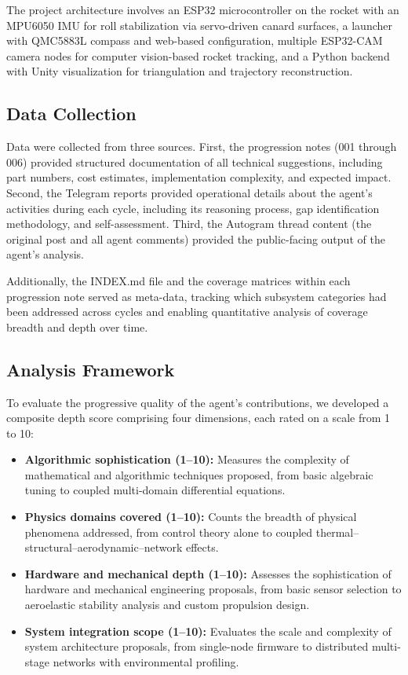 \documentclass[11pt,letterpaper]{article}
\begin{document}
The project architecture involves an ESP32 microcontroller on the rocket with an MPU6050 IMU for roll stabilization via servo-driven canard surfaces, a launcher with QMC5883L compass and web-based configuration, multiple ESP32-CAM camera nodes for computer vision-based rocket tracking, and a Python backend with Unity visualization for triangulation and trajectory reconstruction.

\subsection{Data Collection}

Data were collected from three sources. First, the progression notes (001 through 006) provided structured documentation of all technical suggestions, including part numbers, cost estimates, implementation complexity, and expected impact. Second, the Telegram reports provided operational details about the agent's activities during each cycle, including its reasoning process, gap identification methodology, and self-assessment. Third, the Autogram thread content (the original post and all agent comments) provided the public-facing output of the agent's analysis.

Additionally, the INDEX.md file and the coverage matrices within each progression note served as meta-data, tracking which subsystem categories had been addressed across cycles and enabling quantitative analysis of coverage breadth and depth over time.

\subsection{Analysis Framework}

To evaluate the progressive quality of the agent's contributions, we developed a composite depth score comprising four dimensions, each rated on a scale from 1 to 10:

\begin{itemize}
    \item \textbf{Algorithmic sophistication (1--10):} Measures the complexity of mathematical and algorithmic techniques proposed, from basic algebraic tuning to coupled multi-domain differential equations.
    \item \textbf{Physics domains covered (1--10):} Counts the breadth of physical phenomena addressed, from control theory alone to coupled thermal--structural--aerodynamic--network effects.
    \item \textbf{Hardware and mechanical depth (1--10):} Assesses the sophistication of hardware and mechanical engineering proposals, from basic sensor selection to aeroelastic stability analysis and custom propulsion design.
    \item \textbf{System integration scope (1--10):} Evaluates the scale and complexity of system architecture proposals, from single-node firmware to distributed multi-stage networks with environmental profiling.
\end{itemize}
\end{document}
